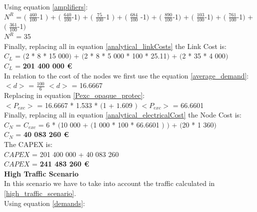 Using equation \ref{amplifiers}:\\

$N^R$ = $($ $\frac{460}{100}$-1 $)$ + $($ $\frac{640}{100}$-1$)$ + $($ $\frac{75}{100}$-1 $)$ + $($ $\frac{684}{100}$ -1$)$ + $($ $\frac{890}{100}$-1$)$ + $($ $\frac{103}{100}$-1$)$ + $($ $\frac{761}{100}$-1$)$ + $($ $\frac{361}{100}$-1$)$\\

$N^R$ = 35\\

Finally, replacing all in equation \ref{analytical_linkCosts} the Link Cost is:\\

$C_L$ = $($2 * 8 * 15 000$)$ + $($2 * 8 * 5 000 * 100 * 25.11$)$ + $($2 * 35 * 4 000$)$\\

$C_L$ = \textbf{201 400 000 \euro}\\

In relation to the cost of the nodes we first use the equation \ref{average_demand}:\\

$<d>$ = $\frac{100}{6}$ \qquad \qquad $<d>$ = 16.6667\\

Replacing in equation \ref{Pexc_opaque_protec}:\\

$<P_{exc}>$ = 16.6667 * 1.533 * $($1 + $1.609$ $)$ \qquad \qquad $<P_{exc}>$ = 66.6601 \\

Finally, replacing all in equation \ref{analytical_electricalCost} the Node Cost is:\\

$C_N$ = $C_{exc}$ = 6 * $($10 000 + $($1 000 * 100 * 66.6601 $)$ $)$ + $($20 * 1 360$)$\\

$C_N$ = \textbf{40 083 260 \euro}\\

The CAPEX is:\\
$CAPEX$ = 201 400 000 + 40 083 260\\

$CAPEX$ = \textbf{241 483 260 \euro}\\

\textbf{High Traffic Scenario}\\
In this scenario we have to take into account the traffic calculated in \ref{high_traffic_scenario}.\\

Using equation \ref{demands}:\\

